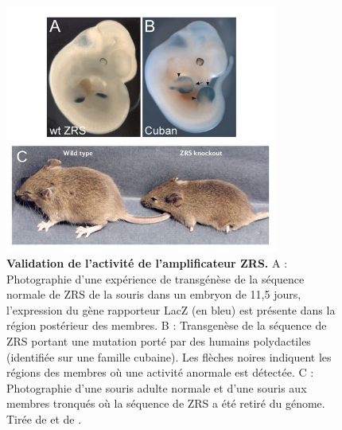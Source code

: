 \begin{figure}[h]
    \centering
    \includegraphics[width=0.8\textwidth, page=1] {figures/introduction/fig11.png}
    \caption[Validation de l'activité de l'\gls{amplificateur} \acrshort{ZRS}.]{
    \textbf{Validation de l'activité de l'\gls{amplificateur} \acrshort{ZRS}.}
    A : Photographie d'une expérience de transgénèse de la séquence normale de \acrshort{ZRS} de la souris dans un embryon de 11,5 jours, l'expression du gène rapporteur LacZ (en bleu) est présente dans la région postérieur des membres. B : Transgenèse de la séquence de \acrshort{ZRS} portant une mutation porté par des humains polydactiles (identifiée sur une famille cubaine). Les flèches noires indiquent les régions des membres où une activité anormale est détectée. C : Photographie d'une souris adulte normale et d'une souris aux membres tronqués où la séquence de \acrshort{ZRS} a été retiré du génome.
    Tirée de \citep{lettice_long-range_2003} et de \citep{sagai_elimination_2005}.\\
    }
    \label{fig:Fig11}
\end{figure}

